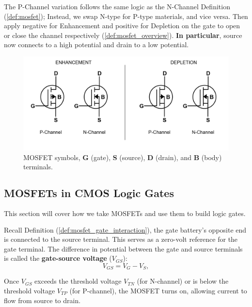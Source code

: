 \vspace{-1em}
\begin{Def}

    \label{def:mosfet_p_channel}

    The P-Channel variation follows the same logic as the N-Channel Definition (\ref{def:mosfet});
    Instead, we swap N-type for P-type materials, and vice versa. Then apply negative for Enhancement
    and positive for Depletion on the gate to open or close the channel respectively (\ref{def:mosfet_overview}).
    \textbf{In particular}, source now connects to a high potential and drain to a low potential.

\end{Def}

\vspace{-1em}
\begin{figure}[ht!]
  \centering
    \includegraphics[width=.9\textwidth]{Sections/circuits/mosfet-symbol.png}
  \caption{MOSFET symbols, \textbf{G} (gate), \textbf{S} (source), \textbf{D} (drain), and \textbf{B} (body) terminals.}
  \label{fig:mosfet-symbol}
\end{figure}

\newpage 

\subsection{MOSFETs in CMOS Logic Gates}

\noindent
This section will cover how we take MOSFETs and use them to build logic gates.

\begin{Def}

  \label{def:gate_source_voltage}

  Recall Definition (\ref{def:mosfet_gate_interaction}), the gate battery's opposite end is connected to the source terminal.
  This serves as a zero-volt reference for the gate terminal.
  The difference in potential between the gate and source terminals is called the \textbf{gate-source voltage} ($V_{GS}$):
  \[
    V_{GS} = V_{G} - V_{S},
  \]
  
  \noindent
  Once $V_{GS}$ exceeds the threshold voltage $V_{TN}$ (for N-channel) or is below the threshold voltage $V_{TP}$ (for P-channel), the MOSFET turns on, allowing current to flow from source to drain.
\end{Def}

